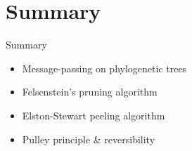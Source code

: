 \documentclass{beamer}
\begin{document}
\section*{Summary}

\begin{frame}{Summary}

  \begin{itemize}
  \item Message-passing on phylogenetic trees
   \itemb
   \item Felsenstein's pruning algorithm
   \item Elston-Stewart peeling algorithm
   \iteme
  \item Pulley principle \& reversibility
  \end{itemize}

\end{frame}
\end{document}
